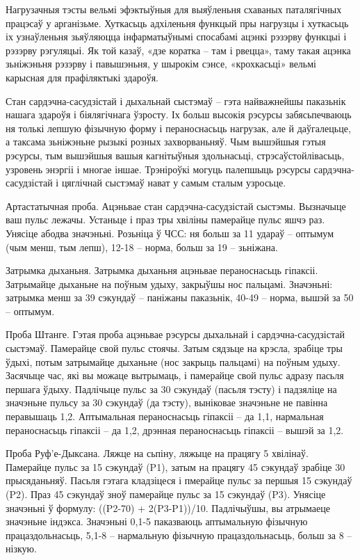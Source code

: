Нагрузачныя тэсты вельмі эфэктыўныя для выяўленьня схаваных паталягічных працэсаў у арганізьме. Хуткасьць адхіленьня функцый пры нагрузцы і хуткасьць іх узнаўленьня зьяўляюцца інфарматыўнымі спосабамі ацэнкі рэзэрву функцыі і рэзэрву рэгуляцыі. Як той казаў, «дзе коратка – там і рвецца», таму такая ацэнка зьніжэньня рэзэрву і павышэньня, у шырокім сэнсе, «крохкасьці» вельмі карысная для прафіляктыкі здароўя.

Стан сардэчна-сасудзістай і дыхальнай сыстэмаў – гэта найважнейшы паказьнік нашага здароўя і біялягічнага ўзросту. Іх больш высокія рэсурсы забясьпечваюць ня толькі лепшую фізычную форму і пераноснасьць нагрузак, але й даўгалецьце, а таксама зьніжэньне рызыкі розных захворваньняў. Чым вышэйшыя гэтыя рэсурсы, тым вышэйшыя вашыя кагнітыўныя здольнасьці, стрэсаўстойлівасьць, узровень энэргіі і многае іншае. Трэніроўкі могуць палепшыць рэсурсы сардэчна-сасудзістай і цяглічнай сыстэмаў нават у самым сталым узросьце.

Артастатычная проба. Ацэньвае стан сардэчна-сасудзістай сыстэмы. Вызначыце ваш пульс лежачы. Устаньце і праз тры хвіліны памерайце пульс яшчэ раз. Унясіце абодва значэньні. Розьніца ў ЧСС: ня больш за 11 удараў – оптымум (чым менш, тым лепш), 12-18 – норма, больш за 19 – зьніжана.

Затрымка дыханьня. Затрымка дыханьня ацэньвае пераноснасьць гіпаксіі. Затрымайце дыханьне на поўным удыху, закрыўшы нос пальцамі. Значэньні: затрымка менш за 39 сэкундаў – паніжаны паказьнік, 40-49 – норма, вышэй за 50 – оптымум.

Проба Штанге. Гэтая проба ацэньвае рэсурсы дыхальнай і сардэчна-сасудзістай сыстэмаў. Памерайце свой пульс стоячы. Затым сядзьце на крэсла, зрабіце тры ўдыхі, потым затрымайце дыханьне (нос закрыць пальцамі) на поўным удыху. Засячыце час, які вы можаце вытрымаць, і памерайце свой пульс адразу пасьля першага ўдыху. Падлічыце пульс за 30 сэкундаў (пасьля тэсту) і падзяліце на значэньне пульсу за 30 сэкундаў (да тэсту), выніковае значэньне не павінна перавышаць 1,2. Аптымальная пераноснасьць гіпаксіі – да 1,1, нармальная пераноснасьць гіпаксіі – да 1,2, дрэнная пераноснасьць гіпаксіі – вышэй за 1,2.

Проба Руф'е-Дыксана. Ляжце на сьпіну, ляжыце на працягу 5 хвілінаў. Памерайце пульс за 15 сэкундаў (P1), затым на працягу 45 сэкундаў зрабіце 30 прысяданьняў. Пасьля гэтага кладзіцеся і пмерайце пульс за першыя 15 сэкундаў (P2). Праз 45 сэкундаў зноў памерайце пульс за 15 сэкундаў (P3). Унясіце значэньні ў формулу: ((P2-70) + 2(P3-P1))/10. Падлічыўшы, вы атрымаеце значэньне індэкса. Значэньні 0,1-5 паказваюць аптымальную фізычную працаздольнасьць, 5,1-8 – нармальную фізычную працаздольнасьць, больш за 8 – нізкую.

